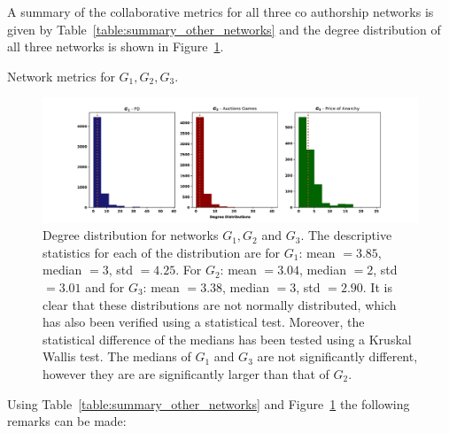 \documentclass{article}
\theoremstyle{definition}
\begin{document}
A summary of the collaborative metrics for all three co authorship networks is given by
Table~\ref{table:summary_other_networks} and the degree distribution of all three
networks is shown in Figure~\ref{fig:degree_distrs}.

\begin{table}[!hbtp]
    \centering
    \resizebox{\textwidth}{!}{
    }
    \caption{Network metrics for \(G_1, G_2, G_3\).}\label{table:summary_other_networks}
\end{table}

\begin{figure}[!hbtp]
    \centering
    \includegraphics[width=\textwidth]{./assets/images/networks_ditributions.pdf}
    \caption{Degree distribution for networks \(G_1, G_2\) and \(G_3\). The descriptive
    statistics for each of the distribution are for \(G_1\): mean \(=3.85\),
    median \(=3\), std \(=4.25\). For \(G_2\): mean \(=3.04\), median \(=2\),
    std \(=3.01\) and for \(G_3\): mean \(=3.38\), median \(=3\), std \(=2.90\).
    It is clear that these distributions are not normally distributed, which has
    also been verified using a statistical test. Moreover, the statistical difference
    of the medians has been tested using a Kruskal Wallis test. The medians
    of \(G_1\) and \(G_3\) are not significantly different, however they are
    are significantly larger than that of \(G_2\).}\label{fig:degree_distrs}
\end{figure}

Using Table~\ref{table:summary_other_networks} and Figure~\ref{fig:degree_distrs}
the following remarks can be made:
\end{document}
